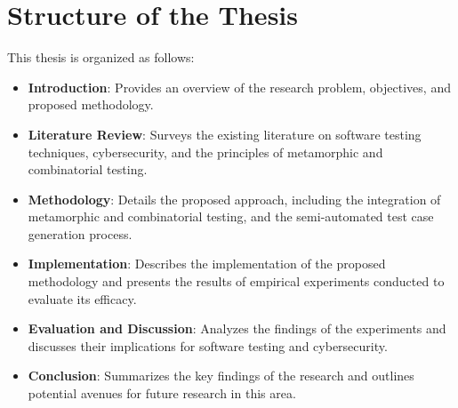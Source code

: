 \section{Structure of the Thesis}

This thesis is organized as follows:

\begin{itemize}
    \item \textbf{Introduction}: Provides an overview of the research problem, objectives, and proposed methodology.
    \item \textbf{Literature Review}: Surveys the existing literature on software testing techniques, cybersecurity, and the principles of metamorphic and combinatorial testing.
    \item \textbf{Methodology}: Details the proposed approach, including the integration of metamorphic and combinatorial testing, and the semi-automated test case generation process.
    \item \textbf{Implementation}: Describes the implementation of the proposed methodology and presents the results of empirical experiments conducted to evaluate its efficacy.
    \item \textbf{Evaluation and Discussion}: Analyzes the findings of the experiments and discusses their implications for software testing and cybersecurity.
    \item \textbf{Conclusion}: Summarizes the key findings of the research and outlines potential avenues for future research in this area.
\end{itemize}



